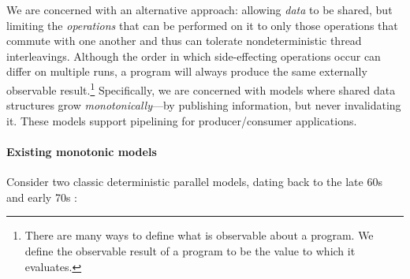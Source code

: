 We are concerned with an alternative approach: allowing {\em data} to
be shared, but limiting the {\em operations} that can be performed on
it to only those operations that commute with one another and thus can
tolerate nondeterministic thread interleavings.  Although the order in
which side-effecting operations occur can differ on multiple runs, a
program will always produce the same externally observable
result.\footnote{There are many ways to define what is observable
  about a program. We define the observable result of a program to be
  the value to which it evaluates.}  Specifically, we are concerned with
models where shared data structures grow {\em monotonically}---by
publishing information, but never invalidating it.  These models
support pipelining for producer/consumer applications.


\paragraph{Existing monotonic models}

Consider two classic deterministic parallel models,
dating back to the late 60s and early 70s \cite{Tesler-1968,Kahn-1974}:



